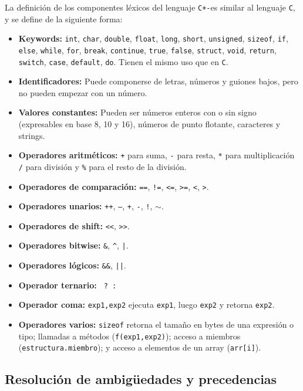 \documentclass[12pt]{article}
\newcommand{\Cp}{\texttt{C+-}}
\newcommand{\C}{\texttt{C}}
\begin{document}
La definici\'on de los componentes l\'exicos del lenguaje \Cp es similar al lenguaje \C, y se define de la siguiente forma:
\begin{itemize}
    \item \textbf{Keywords:} \texttt{int}, \texttt{char}, \texttt{double}, \texttt{float}, \texttt{long}, \texttt{short}, \texttt{unsigned}, \texttt{sizeof}, \texttt{if}, \texttt{else}, \texttt{while}, \texttt{for}, \texttt{break}, \texttt{continue}, \texttt{true}, \texttt{false}, \texttt{struct}, \texttt{void}, \texttt{return}, \texttt{switch}, \texttt{case}, \texttt{default}, \texttt{do}. Tienen el mismo uso que en \C.
    \item \textbf{Identificadores:} Puede componerse de letras, n\'umeros y guiones bajos, pero no pueden empezar con un n\'umero.
    \item \textbf{Valores constantes:} Pueden ser n\'umeros enteros con o sin signo (expresables en base 8, 10 y 16), n\'umeros de punto flotante, caracteres y strings.
    \item \textbf{Operadores aritm\'eticos:} \texttt{+} para suma, \texttt{-} para resta, \texttt{*} para multiplicaci\'on \texttt{/} para divisi\'on y \texttt{\%} para el resto de la divisi\'on.
    \item \textbf{Operadores de comparaci\'on:} \texttt{==}, \texttt{!=}, \texttt{<=}, \texttt{>=}, \texttt{<}, \texttt{>}.
    \item \textbf{Operadores unarios:} \texttt{++}, \texttt{--}, \texttt{+}, \texttt{-}, \texttt{!}, $\mathtt\sim$.
    \item \textbf{Operadores de shift:} \texttt{<<}, \texttt{>>}.
    \item \textbf{Operadores bitwise:} \texttt{\&}, \texttt{\^}, \texttt{|}.
    \item \textbf{Operadores l\'ogicos:} \texttt{\&\&}, \texttt{||}.
    \item \textbf{Operador ternario:} \texttt{ ? : }
    \item \textbf{Operador coma:} \texttt{exp1,exp2} ejecuta \texttt{exp1}, luego \texttt{exp2} y retorna \texttt{exp2}.
    \item \textbf{Operadores varios:} \texttt{sizeof} retorna el tama\~no en bytes de una expresi\'on o tipo; llamadas a m\'etodos (\texttt{f(exp1,exp2)}); acceso a miembros (\texttt{estructura.miembro}); y acceso a elementos de un array (\texttt{arr[i]}).
\end{itemize}

\subsection*{Resoluci\'on de ambig\"uedades y precedencias}
\end{document}
